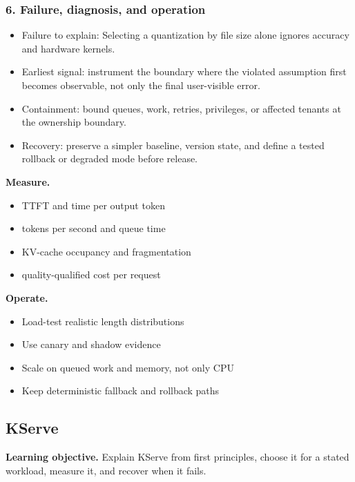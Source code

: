 \subsubsection*{6. Failure, diagnosis, and operation}
\begin{itemize}
\item Failure to explain: Selecting a quantization by file size alone ignores accuracy and hardware kernels.
\item Earliest signal: instrument the boundary where the violated assumption first becomes observable, not only the final user-visible error.
\item Containment: bound queues, work, retries, privileges, or affected tenants at the ownership boundary.
\item Recovery: preserve a simpler baseline, version state, and define a tested rollback or degraded mode before release.
\end{itemize}
\textbf{Measure.}\begin{itemize}
\item TTFT and time per output token
\item tokens per second and queue time
\item KV-cache occupancy and fragmentation
\item quality-qualified cost per request
\end{itemize}
\textbf{Operate.}\begin{itemize}
\item Load-test realistic length distributions
\item Use canary and shadow evidence
\item Scale on queued work and memory, not only CPU
\item Keep deterministic fallback and rollback paths
\end{itemize}
\subsection{KServe}
\textbf{Learning objective.} Explain KServe from first principles, choose it for a stated workload, measure it, and recover when it fails.
